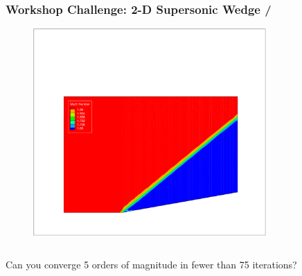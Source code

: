 \documentclass[handout,table]{beamer}
\begin{document}
\begin{frame}[t]
\frametitle{Workshop Challenge: 2-D Supersonic Wedge \hfill  \small{ \insertframenumber/\inserttotalframenumber} }


\begin{figure}
\begin{center}
\includegraphics[width=3.5in]{wedge_mach.pdf}
\label{wedge_mach}
\end{center}
\end{figure}

\begin{columns}
 Can you converge 5 orders of magnitude in fewer than 75 iterations?
\end{columns}

\end{frame}
\end{document}
